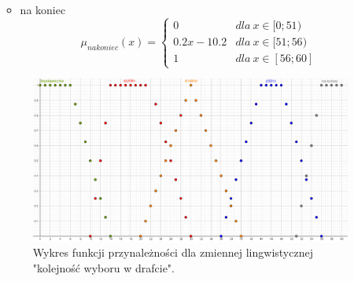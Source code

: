 \documentclass{classrep}
\begin{document}
\begin{enumerate}
\begin{itemize}
\begin{equation}
        \end{equation}
        \item na koniec
        \begin{equation}
            \mu_{nakoniec}(x) = \left\{\begin{matrix}  0 & dla \: x\in [0;51) \\ 0.2x - 10.2 & dla \: x\in[51;56) \\ 1 & dla \: x\in [56;60] \end{matrix}\right.
        \end{equation}
    \end{itemize}
    \begin{figure}[H]
        \centering
        \includegraphics[width=14cm]{wykres_draft.png}
        \caption{Wykres funkcji przynależności dla zmiennej lingwistycznej "kolejność wyboru w drafcie".}
        \label{rysunek:draft}
    \end{figure}
    

\end{enumerate}
\end{document}
